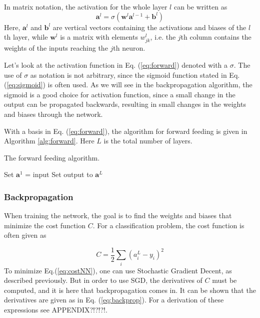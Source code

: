 In matrix notation, the activation for the whole layer $l$ can be written as
\begin{equation}\label{eq:forward}
	\boldsymbol{a}^l = \sigma\left(\boldsymbol{w}^l\boldsymbol{a}^{l-1}+\boldsymbol{b}^l\right)
\end{equation}
Here, $\boldsymbol{a}^l$ and $\boldsymbol{b}^l$ are vertical vectors containing the activations and biases of the $l$th layer, while $\boldsymbol{w}^l$ is a matrix with elements $w^l_{jk}$, i.e. the $j$th column contains the weights of the inputs reaching the $j$th neuron.  

Let's look at the activation function in Eq. (\ref{eq:forward}) denoted with a $\sigma$. The use of $\sigma$ as notation is not arbitrary, since the sigmoid function stated in Eq. (\ref{eq:sigmoid}) is often used. As we will see in the backpropagation algorithm, the sigmoid is a good choice for activation function, since a small change in the output can be propagated backwards, resulting in small changes in the weights and biases through the network.

With a basis in Eq. (\ref{eq:forward}), the algorithm for forward feeding is given in Algorithm \ref{alg:forward}. Here $L$ is the total number of layers. 
\begin{algorithm}[htbp]\caption{The forward feeding algorithm.}\label{alg:forward}
	\SetAlgoLined
	\BlankLine
	\BlankLine
	Set $\boldsymbol{a}^1$ = input\;
	Set output to $\boldsymbol{a}^L$\;
	\BlankLine
	\BlankLine
\end{algorithm}  

\subsubsection*{Backpropagation}
When training the network, the goal is to find the weights and biases that minimize the cost function $C$. For a classification problem, the cost function is often given as

\begin{equation}\label{eq:costNN}
	C = \frac{1}{2}\sum_{i}\left(a^L_i-y_i\right)^2
\end{equation}  
To minimize Eq.(\ref{eq:costNN}), one can use Stochastic Gradient Decent, as described previously. But in order to use SGD, the derivatives of $C$ must be computed, and it is here that backpropagation comes in. It can be shown that the derivatives are given as in Eq. (\ref{eq:backprop}). For a derivation of these expressions see APPENDIX?!?!?!. 


